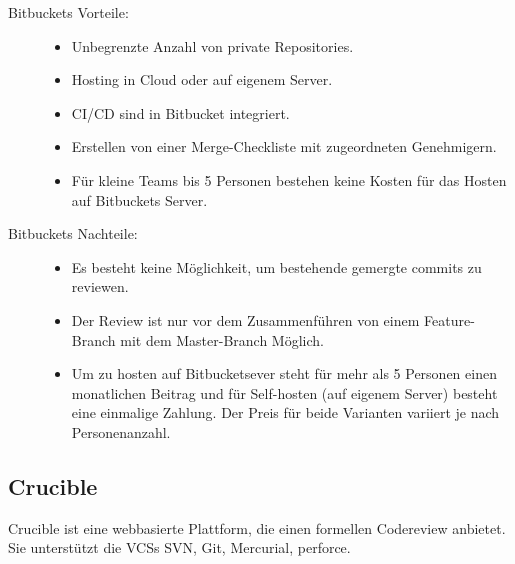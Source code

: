 \begin{description}
	\item [Bitbuckets Vorteile:] \hfill
	\begin{itemize}
		\item Unbegrenzte Anzahl von private Repositories.
		\item Hosting in Cloud oder auf eigenem Server.
		\item \ac{CI}/\ac{CD} sind in Bitbucket integriert.
		\item Erstellen von einer Merge-Checkliste mit zugeordneten Genehmigern.
		\item Für kleine Teams bis 5 Personen bestehen keine Kosten für das Hosten auf Bitbuckets Server.
	\end{itemize}
	
	\item [Bitbuckets Nachteile:] \hfill
	\begin{itemize}
		\item Es besteht keine Möglichkeit, um bestehende gemergte commits zu reviewen.
		\item Der Review ist nur vor dem Zusammenführen von einem Feature-Branch mit dem Master-Branch Möglich.
		\item Um zu hosten auf Bitbucketsever steht für mehr als 5 Personen einen monatlichen Beitrag und für Self-hosten (auf eigenem Server) besteht eine einmalige Zahlung. Der 
			Preis für beide Varianten variiert je nach Personenanzahl.
	\end{itemize}
\end{description}

\subsection{Crucible}
\label{subsec:Crucible}

Crucible ist eine webbasierte Plattform, die einen formellen Codereview anbietet. Sie unterstützt die \acp{VCS} \ac{SVN}, Git, Mercurial, perforce.

